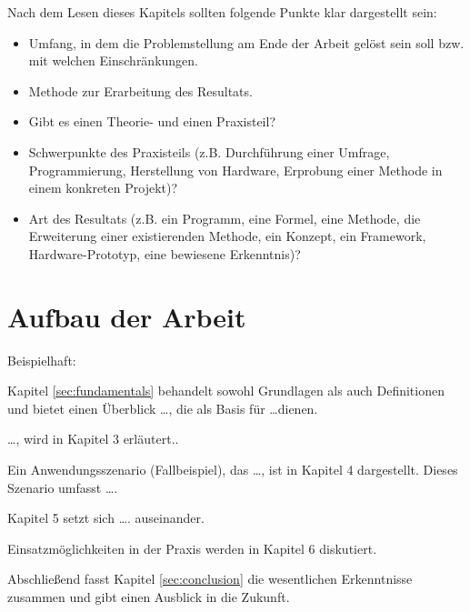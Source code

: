 \makeatletter\ifthesis@masterthesis
Nach dem Lesen dieses Kapitels sollten folgende Punkte klar dargestellt sein:
\begin{itemize}
	\item Umfang, in dem die Problemstellung am Ende der Arbeit gelöst sein soll bzw. mit welchen Einschränkungen.
	\item Methode zur Erarbeitung des Resultats.
	\item Gibt es einen Theorie- und einen Praxisteil?
	\item Schwerpunkte des Praxisteils (z.B. Durchführung einer Umfrage, Programmierung, Herstellung von Hardware, Erprobung einer Methode in einem konkreten Projekt)?
	\item Art des Resultats (z.B. ein Programm, eine Formel, eine Methode, die Erweiterung einer existierenden Methode, ein Konzept, ein Framework, Hardware-Prototyp, eine bewiesene Erkenntnis)?
\end{itemize}
\fi\makeatother

\makeatletter\ifthesis@masterthesis
\section{Aufbau der Arbeit}

Beispielhaft:

Kapitel \ref{sec:fundamentals} behandelt sowohl Grundlagen als auch Definitionen und bietet einen Überblick \dots, die als Basis für \dots dienen.

\dots, wird in Kapitel 3 erläutert..

Ein Anwendungsszenario (Fallbeispiel), das \dots, ist in Kapitel 4 dargestellt. Dieses Szenario umfasst \dots.

Kapitel 5 setzt sich \dots. auseinander.

Einsatzmöglichkeiten in der Praxis werden in Kapitel 6 diskutiert.

Abschließend fasst Kapitel \ref{sec:conclusion} die wesentlichen Erkenntnisse zusammen und gibt einen Ausblick in die Zukunft.
\fi\makeatother


